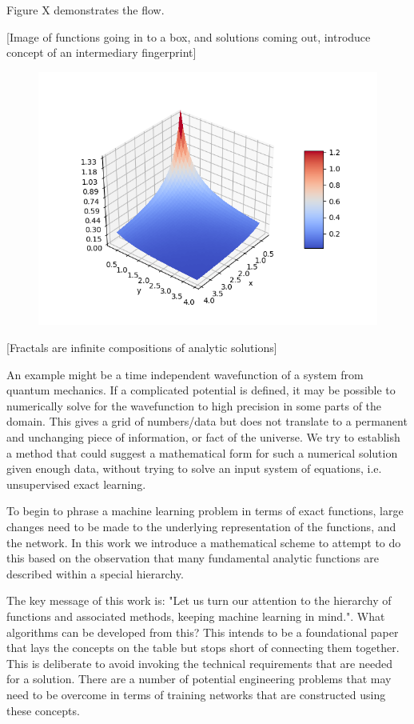 \documentclass{article}
\begin{document}
Figure X demonstrates the flow.

[Image of functions going in to a box, and solutions coming out, introduce concept of an intermediary fingerprint]
\begin{figure}
\includegraphics[scale = 1]{Distribution/2D.png}
\caption{}
\end{figure}


[Fractals are infinite compositions of analytic solutions]



An example might be a time independent wavefunction of a system from quantum mechanics. If a complicated potential is defined, it may be possible to numerically solve for the wavefunction to high precision in some parts of the domain. This gives a grid of numbers/data but does not translate to a permanent and unchanging piece of information, or fact of the universe. We try to establish a method that could suggest a mathematical form for such a numerical solution given enough data, without trying to solve an input system of equations, i.e. unsupervised exact learning.

To begin to phrase a machine learning problem in terms of exact functions, large changes need to be made to the underlying representation of the functions, and the network. In this work we introduce a mathematical scheme to attempt to do this based on the observation that many fundamental analytic functions are described within a special hierarchy.

The key message of this work is: "Let us turn our attention to the hierarchy of functions and associated methods, keeping machine learning in mind.". What algorithms can be developed from this? This intends to be a foundational paper that lays the concepts on the table but stops short of connecting them together. This is deliberate to avoid invoking the technical requirements that are needed for a solution. There are a number of potential engineering problems that may need to be overcome in terms of training networks that are constructed using these concepts.
\end{document}
